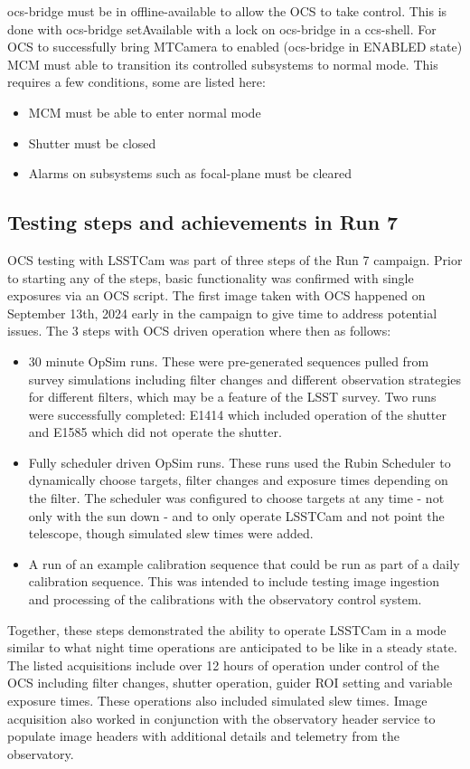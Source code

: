 ocs-bridge must be in offline-available to allow the OCS to take control. This is done with ocs-bridge setAvailable with a lock on ocs-bridge in a ccs-shell. For OCS to successfully bring MTCamera to enabled (ocs-bridge in ENABLED state) MCM must able to transition its controlled subsystems to normal mode. This requires a few conditions, some are listed here:
\begin{itemize}
    \item MCM must be able to enter normal mode
    \item Shutter must be closed
    \item Alarms on subsystems such as focal-plane must be cleared
\end{itemize}

\subsection{Testing steps and achievements in Run 7}
OCS testing with LSSTCam was part of three steps of the Run 7 campaign. Prior to starting any of the steps, basic functionality was confirmed with single exposures via an OCS script. The first image taken with OCS happened on September 13th, 2024 early in the campaign to give time to address potential issues. The 3 steps with OCS driven operation where then as follows:
\begin{itemize}
    \item 30 minute OpSim runs. These were pre-generated sequences pulled from survey simulations including filter changes and different observation strategies for different filters, which may be a feature of the LSST survey. Two runs were successfully completed: E1414 which included operation of the shutter and E1585 which did not operate the shutter.
    \item Fully scheduler driven OpSim runs. These runs used the Rubin Scheduler to dynamically choose targets, filter changes and exposure times depending on the filter. The scheduler was configured to choose targets at any time - not only with the sun down - and to only operate LSSTCam and not point the telescope, though simulated slew times were added. 
    \item A run of an example calibration sequence that could be run as part of a daily calibration sequence. This was intended to include testing image ingestion and processing of the calibrations with the observatory control system.
\end{itemize}

Together, these steps demonstrated the ability to operate LSSTCam in a mode similar to what night time operations are anticipated to be like in a steady state. The listed acquisitions include over 12 hours of operation under control of the OCS including filter changes, shutter operation, guider ROI setting and variable exposure times. These operations also included simulated slew times. Image acquisition also worked in conjunction with the observatory header service to populate image headers with additional details and telemetry from the observatory.

